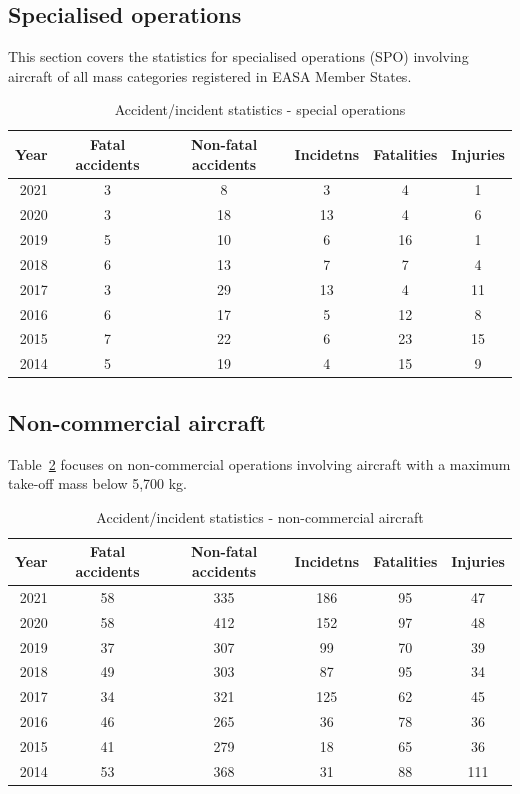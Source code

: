 \documentclass[
  11pt,
  a4paper,
]{book}
\begin{document}
\hypertarget{specialised-operations}{%
\subsection{Specialised operations}\label{specialised-operations}}

This section covers the statistics for specialised operations (SPO)
involving aircraft of all mass categories registered in EASA Member
States.

\hypertarget{tbl-statistics-specialops}{}
\begin{longtable}{rccccc}
\caption{\label{tbl-statistics-specialops}Accident/incident statistics - special operations }\tabularnewline

\toprule
Year & Fatal accidents & Non-fatal accidents & Incidetns & Fatalities & Injuries \\ 
\midrule
2021 & 3 & 8 & 3 & 4 & 1 \\ 
2020 & 3 & 18 & 13 & 4 & 6 \\ 
2019 & 5 & 10 & 6 & 16 & 1 \\ 
2018 & 6 & 13 & 7 & 7 & 4 \\ 
2017 & 3 & 29 & 13 & 4 & 11 \\ 
2016 & 6 & 17 & 5 & 12 & 8 \\ 
2015 & 7 & 22 & 6 & 23 & 15 \\ 
2014 & 5 & 19 & 4 & 15 & 9 \\ 
\bottomrule
\end{longtable}

\hypertarget{non-commercial-aircraft}{%
\subsection{Non-commercial aircraft}\label{non-commercial-aircraft}}

Table~\ref{tbl-statistics-noncommercial} focuses on non-commercial
operations involving aircraft with a maximum take-off mass below 5,700
kg.

\hypertarget{tbl-statistics-noncommercial}{}
\begin{longtable}{rccccc}
\caption{\label{tbl-statistics-noncommercial}Accident/incident statistics - non-commercial aircraft }\tabularnewline

\toprule
Year & Fatal accidents & Non-fatal accidents & Incidetns & Fatalities & Injuries \\ 
\midrule
2021 & 58 & 335 & 186 & 95 & 47 \\ 
2020 & 58 & 412 & 152 & 97 & 48 \\ 
2019 & 37 & 307 & 99 & 70 & 39 \\ 
2018 & 49 & 303 & 87 & 95 & 34 \\ 
2017 & 34 & 321 & 125 & 62 & 45 \\ 
2016 & 46 & 265 & 36 & 78 & 36 \\ 
2015 & 41 & 279 & 18 & 65 & 36 \\ 
2014 & 53 & 368 & 31 & 88 & 111 \\ 
\bottomrule
\end{longtable}
\end{document}
